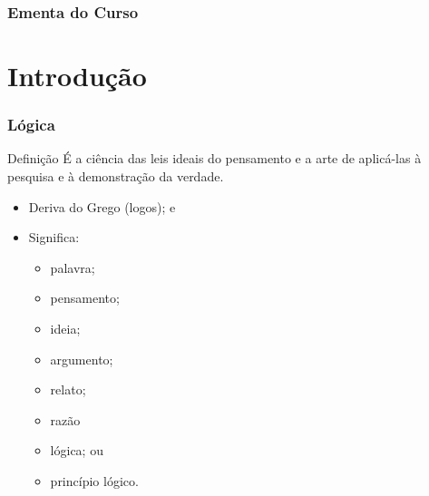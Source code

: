 \documentclass{beamer}
\begin{document}
\begin{frame}
	\frametitle{Ementa do Curso}
  	\tableofcontents
\end{frame}


\section{Introdução}

\begin{frame}
	\frametitle{Lógica}

	\begin{block}{Definição}
		É a ciência das leis ideais do pensamento e a arte de aplicá-las à pesquisa e à demonstração da verdade.
	\end{block}\vfill
	
	\begin{itemize}
		\item Deriva do Grego (logos); e
		\item Significa:
			\begin{itemize}
			\item palavra;
			\item pensamento;
			\item ideia;
			\item argumento;
			\item relato;
			\item razão
			\item lógica; ou
			\item princípio lógico.
			\end{itemize}
	\end{itemize}
\end{frame}
\end{document}
